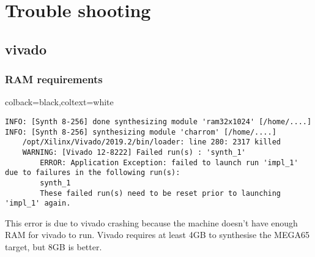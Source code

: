 \chapter{Trouble shooting}
    \section{vivado}
    \subsection{RAM requirements}
    \begin{tcolourbox}{colback=black,coltext=white}
    \verbatimfont{\codefont}
    \begin{verbatim}
INFO: [Synth 8-256] done synthesizing module 'ram32x1024' [/home/....]
INFO: [Synth 8-256] synthesizing module 'charrom' [/home/....]
    /opt/Xilinx/Vivado/2019.2/bin/loader: line 280: 2317 killed
    WARNING: [Vivado 12-8222] Failed run(s) : 'synth_1'
        ERROR: Application Exception: failed to launch run 'impl_1' due to failures in the following run(s):
        synth_1
        These failed run(s) need to be reset prior to launching 'impl_1' again.
    \end{verbatim}
    \end{tcolourbox}
This error is due to vivado crashing because the machine doesn't have enough RAM for vivado to run.
Vivado requires at least 4GB to synthesise the MEGA65 target, but 8GB is better.

